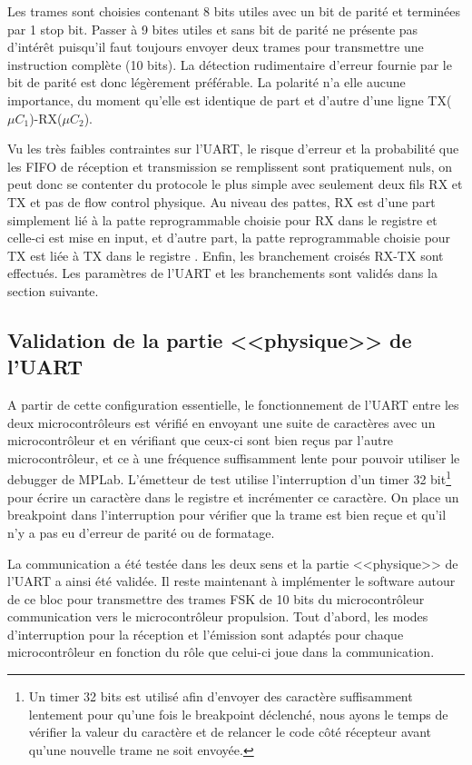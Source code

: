 Les trames sont choisies contenant 8 bits utiles avec un bit de parité et terminées par 1 stop bit. Passer à 9 bites utiles et sans bit de parité ne présente pas d'intérêt puisqu'il faut toujours envoyer deux trames pour transmettre une instruction complète (10 bits). La détection rudimentaire d'erreur fournie par le bit de parité est donc légèrement préférable. La polarité n'a elle aucune importance, du moment qu'elle est identique de part et d'autre d'une ligne TX($\mu C_1$)-RX($\mu C_2$).

Vu les très faibles contraintes sur l'UART, le risque d'erreur et la probabilité que les FIFO de réception et transmission se remplissent sont pratiquement nuls, on peut donc se contenter du protocole le plus simple avec seulement deux fils RX et TX et pas de flow control physique. Au niveau des pattes, RX est d'une part simplement lié à la patte reprogrammable choisie pour RX dans le registre  et celle-ci est mise en input, et d'autre part, la patte reprogrammable choisie pour TX est liée à TX dans le registre . Enfin, les branchement croisés RX-TX sont effectués. Les paramètres de l'UART et les branchements sont validés dans la section suivante.

\subsection{Validation de la partie <<physique>> de l'UART}
A partir de cette configuration essentielle, le fonctionnement de l'UART entre les deux microcontrôleurs est vérifié en envoyant une suite de caractères avec un microcontrôleur et en vérifiant que ceux-ci sont bien reçus par l'autre microcontrôleur, et ce à une fréquence suffisamment lente pour pouvoir utiliser le debugger de MPLab. L'émetteur de test utilise l'interruption d'un timer 32 bit\footnote{Un timer 32 bits est utilisé afin d'envoyer des caractère suffisamment lentement pour qu'une fois le breakpoint déclenché, nous ayons le temps de vérifier la valeur du caractère et de relancer le code côté récepteur avant qu'une nouvelle trame ne soit envoyée.} pour écrire un caractère dans le registre  et incrémenter ce caractère. On place un breakpoint dans l'interruption  pour vérifier que la trame est bien reçue et qu'il n'y a pas eu d'erreur de parité ou de formatage.

La communication a été testée dans les deux sens et la partie <<physique>> de l'UART a ainsi été validée. Il reste maintenant à implémenter le software autour de ce bloc pour transmettre des trames FSK de 10 bits du microcontrôleur communication vers le microcontrôleur propulsion. Tout d'abord, les modes d'interruption pour la réception et l'émission sont adaptés pour chaque microcontrôleur en fonction du rôle que celui-ci joue dans la communication.

